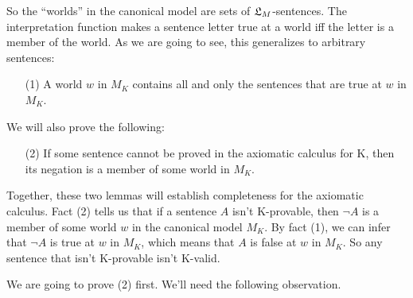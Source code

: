 
So the ``worlds'' in the canonical model are sets of $\mathfrak{L}_M$-sentences. The
interpretation function makes a sentence letter true at a world iff the letter
is a member of the world. As we are going to see, this generalizes to arbitrary
sentences:
\begin{enumerate}[leftmargin=10mm]
  \item[(1)] A world $w$ in $M_K$ contains all and only the sentences that are
        true at $w$ in $M_K$.
\end{enumerate}
We will also prove the following:
\begin{enumerate}[leftmargin=10mm]
  \item[(2)] If some sentence cannot be proved in the axiomatic calculus for K,
        then its negation is a member of some world in $M_K$.
\end{enumerate}

Together, these two lemmas will establish completeness for the axiomatic
calculus. Fact (2) tells us that if a sentence $A$ isn't K-provable, then
$\neg A$ is a member of some world $w$ in the canonical model $M_K$. By fact
(1), we can infer that $\neg A$ is true at $w$ in $M_K$, which means that $A$ is
false at $w$ in $M_K$. So any sentence that isn't K-provable isn't K-valid.

We are going to prove (2) first. We'll need the following observation. 

